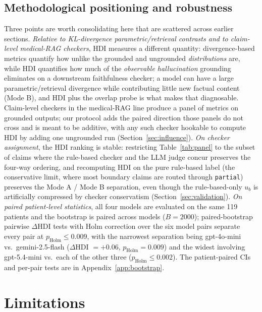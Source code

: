 \documentclass{article}
\theoremstyle{plain}
\begin{document}
\subsection{Methodological positioning and robustness}
\label{sec:positioning}

Three points are worth consolidating here that are scattered across earlier sections. \emph{Relative to KL-divergence parametric/retrieval contrasts and to claim-level medical-RAG checkers}, HDI measures a different quantity: divergence-based metrics quantify how unlike the grounded and ungrounded \emph{distributions} are, while HDI quantifies how much of the \emph{observable hallucination} grounding eliminates on a downstream faithfulness checker; a model can have a large parametric/retrieval divergence while contributing little new factual content (Mode B), and HDI plus the overlap probe is what makes that diagnosable. Claim-level checkers in the medical-RAG line produce a panel of metrics on grounded outputs; our protocol adds the paired direction those panels do not cross and is meant to be additive, with any such checker hookable to compute HDI by adding one ungrounded run (Section~\ref{sec:influence}). \emph{On checker assignment}, the HDI ranking is stable: restricting Table~\ref{tab:panel} to the subset of claims where the rule-based checker and the LLM judge concur preserves the four-way ordering, and recomputing HDI on the pure rule-based label (the conservative limit, where most boundary claims are routed through \texttt{partial}) preserves the Mode A / Mode B separation, even though the rule-based-only $u_b$ is artificially compressed by checker conservatism (Section~\ref{sec:validation}). \emph{On paired patient-level statistics}, all four models are evaluated on the same 119 patients and the bootstrap is paired across models ($B{=}2000$); paired-bootstrap pairwise $\Delta$HDI tests with Holm correction over the six model pairs separate every pair at $p_{\text{Holm}} \leq 0.009$, with the narrowest separation being gpt-4o-mini vs.\ gemini-2.5-flash ($\Delta$HDI $= +0.06$, $p_{\text{Holm}} = 0.009$) and the widest involving gpt-5.4-mini vs.\ each of the other three ($p_{\text{Holm}} \leq 0.002$). The patient-paired CIs and per-pair tests are in Appendix~\ref{app:bootstrap}.

\section*{Limitations}
\label{sec:limitations}
\end{document}

